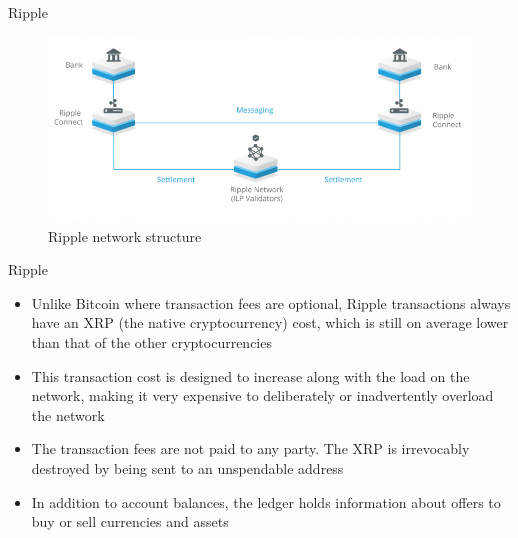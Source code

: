 \documentclass[9pt]{beamer}
\begin{document}

\begin{frame}{Ripple}
	\begin{figure}[]
		\centering
		\includegraphics  [scale=0.3]{Images/ripple1}
		\caption{Ripple network structure}
	\end{figure}
\end{frame}


\begin{frame}{Ripple}
	\begin{itemize}
		\item Unlike Bitcoin where transaction fees are optional, Ripple transactions always have an XRP (the native cryptocurrency) cost, which is still on average lower than that of the other cryptocurrencies
		\item This transaction cost is designed to increase along with the load on the network, making it very expensive to deliberately or inadvertently overload the network
		\item The transaction fees are not paid to any party. The XRP is irrevocably destroyed by being sent to an unspendable address
		\item In addition to account balances, the ledger holds information about offers to buy or sell currencies and assets
	\end{itemize}
\end{frame}

\end{document}
